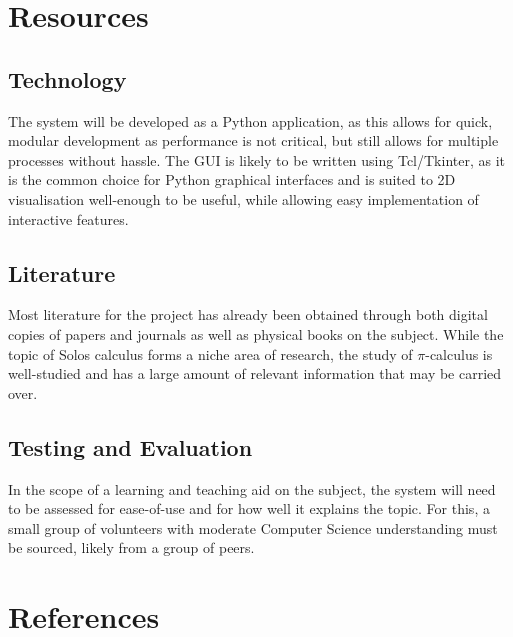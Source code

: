 \documentclass{article}
\begin{document}
\section{Resources}
\subsection{Technology}
The system will be developed as a Python application, as this allows for quick, modular development as performance is not critical, but still allows for multiple processes without hassle.
The GUI is likely to be written using Tcl/Tkinter, as it is the common choice for Python graphical interfaces and is suited to 2D visualisation well-enough to be useful, while allowing easy implementation of interactive features.

\subsection{Literature}
Most literature for the project has already been obtained through both digital copies of papers and journals as well as physical books on the subject. While the topic of Solos calculus forms a niche area of research, the study of $\pi$-calculus is well-studied and has a large amount of relevant information that may be carried over.

\subsection{Testing and Evaluation}
In the scope of a learning and teaching aid on the subject, the system will need to be assessed for ease-of-use and for how well it explains the topic. For this, a small group of volunteers with moderate Computer Science understanding must be sourced, likely from a group of peers.


\section{References}




\end{document}
